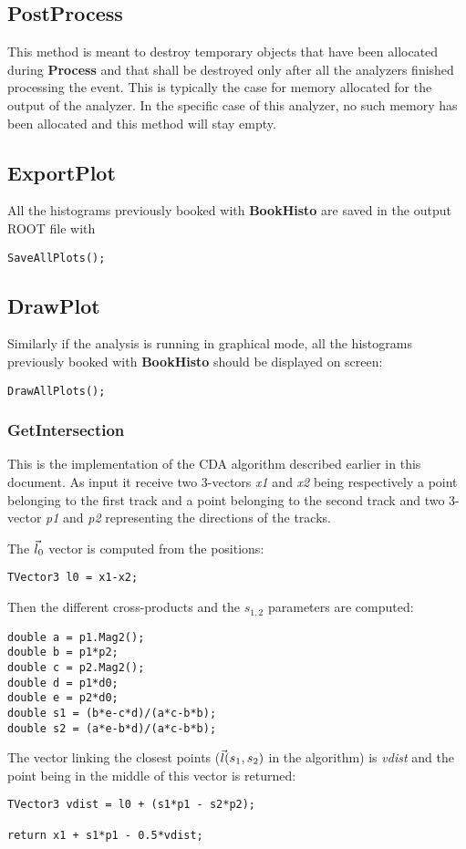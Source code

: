 \documentclass{article}
\newcommand{\method}[1]{\textbf{#1}}
\newcommand{\var}[1]{\textit{#1}}
\begin{document}
\subsection{PostProcess}
This method is meant to destroy temporary objects that have been allocated during \method{Process}
and that shall be destroyed only after all the analyzers finished processing the event. This is
typically the case for memory allocated for the output of the analyzer. In the specific case of this
analyzer, no such memory has been allocated and this method will stay empty.

\subsection{ExportPlot}
All the histograms previously booked with \method{BookHisto} are saved in the output ROOT file with

\begin{lstlisting}
SaveAllPlots();
\end{lstlisting} 

\subsection{DrawPlot}
Similarly if the analysis is running in graphical mode, all the histograms previously booked with
\method{BookHisto} should be displayed on screen:

\begin{lstlisting}
DrawAllPlots();
\end{lstlisting} 

\subsubsection{GetIntersection}\label{GetIntersection}
This is the implementation of the CDA algorithm described earlier in this document. As input it
receive two 3-vectors \var{x1} and \var{x2} being respectively a point belonging to the first track
and a point belonging to the second track and two 3-vector \var{p1} and \var{p2} representing the
directions of the tracks.

The $\vec{l}_{0}$ vector is computed from the positions: 
\begin{lstlisting}
TVector3 l0 = x1-x2;
\end{lstlisting}
Then the different cross-products and the $s_{1,2}$ parameters are computed:
\begin{lstlisting}
double a = p1.Mag2();
double b = p1*p2;
double c = p2.Mag2();
double d = p1*d0;
double e = p2*d0;
double s1 = (b*e-c*d)/(a*c-b*b);
double s2 = (a*e-b*d)/(a*c-b*b);
\end{lstlisting}
The vector linking the closest points ($\vec{l}(s_1, s_2)$ in the algorithm) is \var{vdist} and the
point being in the middle of this vector is returned:
\begin{lstlisting}
TVector3 vdist = l0 + (s1*p1 - s2*p2);

return x1 + s1*p1 - 0.5*vdist;
\end{lstlisting}
\end{document}
